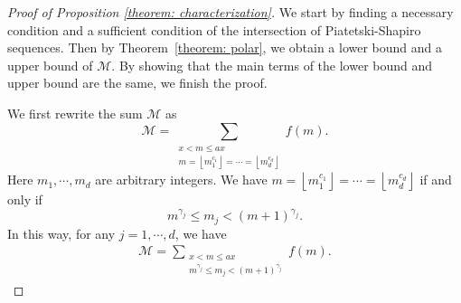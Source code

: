 \documentclass[12pt, reqno, twoside, letterpaper]{amsart}
\numberwithin{equation}{section}
\def\fl#1{\left\lfloor#1\right\rfloor}
\newcommand{\cM}{\ensuremath{\mathcal{M}}}
\theoremstyle{customthm}
\theoremstyle{customrem}
\begin{document}
\begin{proof}[Proof of Proposition \ref{theorem: characterization}]
We start by finding a necessary condition and a sufficient condition of the intersection of Piatetski-Shapiro sequences. Then by Theorem~\ref{theorem: polar}, we obtain a lower bound and a upper bound of $\cM$. By showing that the main terms of the lower bound and upper bound are the same, we finish the proof.

We first rewrite the sum $\cM$ as
$$
\cM = \sum_{\substack{x < m \leqslant ax \\ m=\fl{m_1^{c_1 }}=\cdots=\fl{m_d^{c_d}}}} f(m).
$$
Here $m_1,\cdots,m_d$ are arbitrary integers. We have $m=\fl{m_1^{c_1 }}=\cdots=\fl{m_d^{c_d}}$ if and only if
$$
m^{\gamma_j} \leqslant m_j < (m+1)^{\gamma_j}.
$$
In this way, for any $j=1,\cdots,d$, we have
\begin{align}\label{prop6.2.1}
\cM =\sum_{\substack{x < m \leqslant ax \\ m^{\gamma_j} \leqslant m_j < (m+1)^{\gamma_j}}} f(m).
\end{align}


\end{proof}
\end{document}
